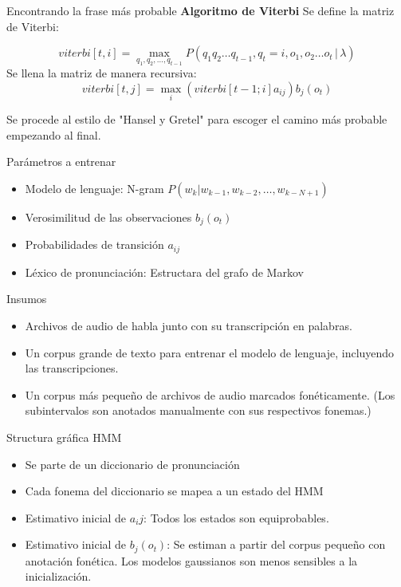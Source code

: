 \documentclass[11pt,xcolor={dvipsnames}]{beamer}
\begin{document}
\begin{frame}{Encontrando la frase más probable}
\textbf{Algoritmo de Viterbi} Se define la matriz de Viterbi:

$$viterbi[t,i] = \max_{q_1,q_2,\ldots, q_{t-1}} P(q_1q_2 \ldots q_{t-1}, q_t=i, o_1,o_2\ldots o_t\,|\,\lambda )$$
Se llena la matriz de manera recursiva:
$$viterbi [t , j] = \max_i(viterbi[t-1; i] a_{ij} ) b_j(o_t)$$

Se procede al estilo de "Hansel y Gretel" para escoger el camino más probable empezando al final.
\end{frame}

\begin{frame}{Parámetros a entrenar}
\begin{itemize}
\item Modelo de lenguaje: N-gram $P (w_k |w_{k-1} , w_{k-2} , \ldots , w_{k-N +1})$
\item Verosimilitud de las observaciones $b_j(o_t)$
\item Probabilidades de transición $a_{ij}$
\item Léxico de pronunciación: Estructara del grafo de Markov
\end{itemize}
\end{frame}

\begin{frame}{Insumos}
\begin{itemize}
\item Archivos de audio de habla junto con su transcripción en palabras.
\item Un corpus grande de texto para entrenar el modelo de lenguaje, incluyendo las transcripciones.
\item Un corpus más pequeño de archivos de audio marcados fonéticamente. (Los subintervalos son anotados manualmente con sus respectivos fonemas.)
\end{itemize}
\end{frame}

\begin{frame}{Structura gráfica HMM}
\begin{itemize}
\item Se parte de un diccionario de pronunciación
\item Cada fonema del diccionario se mapea a un estado del HMM
\item Estimativo inicial de $a_ij$: Todos los estados son equiprobables. 
\item Estimativo inicial de $b_j(o_t)$: Se estiman a partir del corpus pequeño con anotación fonética. Los modelos gaussianos son menos sensibles a la inicialización.
\end{itemize}
\end{frame}
\end{document}
